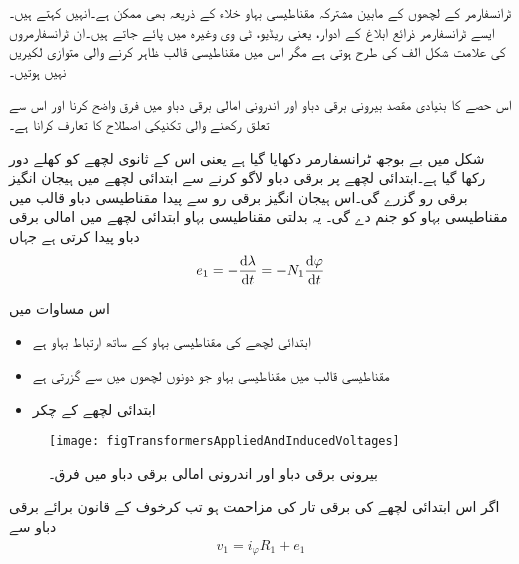 ٹرانسفارمر کے لچھوں کے مابین مشترکہ مقناطیسی بہاو خلاء کے ذریعہ بھی ممکن ہے۔انہیں   کہتے ہیں۔ ایسے ٹرانسفارمر ذرائع ابلاغ کے ادوار، یعنی ریڈیو، ٹی وی وغیرہ میں پائے جاتے ہیں۔ان ٹرانسفارمروں کی علامت  شکل  الف کی طرح ہوتی ہے مگر اس میں مقناطیسی قالب ظاہر کرنے والی متوازی لکیریں نہیں ہوتیں۔

اس حصے کا بنیادی مقصد بیرونی برقی دباو   اور اندرونی امالی برقی دباو   میں فرق واضح کرنا اور اس سے تعلق رکھنے والی تکنیکی اصطلاح کا تعارف کرانا ہے۔

شکل   میں بے بوجھ ٹرانسفارمر دکھایا گیا ہے یعنی اس کے ثانوی لچھے کو کھلے دور رکھا گیا ہے۔ابتدائی لچھے پر  برقی دباو لاگو کرنے سے ابتدائی لچھے میں ہیجان انگیز برقی رو  گزرے گی۔اس ہیجان انگیز برقی رو سے پیدا مقناطیسی دباو   قالب میں مقناطیسی بہاو   کو جنم دے گی۔ یہ بدلتی مقناطیسی بہاو ابتدائی لچھے میں امالی برقی  دباو   پیدا کرتی ہے جہاں
\begin{align}
e_1=-\frac{\dif \lambda}{\dif t}=-N_1 \frac{\dif \varphi}{\dif t}
\end{align}

 اس مساوات میں
\begin{itemize}
\item
{} ابتدائی لچھے کی مقناطیسی بہاو کے ساتھ ارتباط بہاو ہے
\item
{} مقناطیسی قالب میں مقناطیسی بہاو جو دونوں لچھوں میں سے گزرتی ہے
\item
{} ابتدائی لچھے کے چکر
\end{itemize}
%
\begin{figure}
\centering
\texttt{[image: figTransformersAppliedAndInducedVoltages]}
\caption{بیرونی برقی دباو اور اندرونی امالی برقی دباو میں فرق۔}
\label{شکل_ٹرانسفارمر_بیرونی_اور_اندرونی_برقی_دباو}
\end{figure}

اگر اس ابتدائی لچھے کی برقی تار کی مزاحمت  ہو تب کرخوف کے قانون برائے برقی دباو سے
\begin{align}\label{مساوات_ٹرانسفارمر_بیرونی_اندرونی_دباو_فرق}
v_1 = i_{\varphi} R_1+e_1
\end{align}


